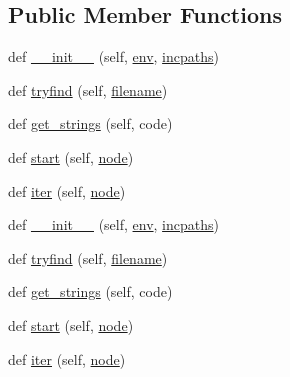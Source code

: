 \subsection*{Public Member Functions}
\begin{DoxyCompactItemize}
\item 
def \hyperlink{classwaflib_1_1_tools_1_1d__scan_1_1d__parser_a7fa583b71418108508c4fe69d9a0c269}{\+\_\+\+\_\+init\+\_\+\+\_\+} (self, \hyperlink{classwaflib_1_1_tools_1_1d__scan_1_1d__parser_aa28424987acc747e7ef28b0126fcb2c2}{env}, \hyperlink{classwaflib_1_1_tools_1_1d__scan_1_1d__parser_ab112695a99d61b3e5ae3d0014ae2210d}{incpaths})
\item 
def \hyperlink{classwaflib_1_1_tools_1_1d__scan_1_1d__parser_abee559e65fb60e81b8fe312d51f3fb57}{tryfind} (self, \hyperlink{test__portburn_8cpp_a7efa5e9c7494c7d4586359300221aa5d}{filename})
\item 
def \hyperlink{classwaflib_1_1_tools_1_1d__scan_1_1d__parser_ade8c37be217528fff038ca936888a7ce}{get\+\_\+strings} (self, code)
\item 
def \hyperlink{classwaflib_1_1_tools_1_1d__scan_1_1d__parser_aaae013d257f5425b6af59448cc311aae}{start} (self, \hyperlink{structnode}{node})
\item 
def \hyperlink{classwaflib_1_1_tools_1_1d__scan_1_1d__parser_a8c15f46ea130e19ea52e60cdcfec7c6e}{iter} (self, \hyperlink{structnode}{node})
\item 
def \hyperlink{classwaflib_1_1_tools_1_1d__scan_1_1d__parser_a7fa583b71418108508c4fe69d9a0c269}{\+\_\+\+\_\+init\+\_\+\+\_\+} (self, \hyperlink{classwaflib_1_1_tools_1_1d__scan_1_1d__parser_aa28424987acc747e7ef28b0126fcb2c2}{env}, \hyperlink{classwaflib_1_1_tools_1_1d__scan_1_1d__parser_ab112695a99d61b3e5ae3d0014ae2210d}{incpaths})
\item 
def \hyperlink{classwaflib_1_1_tools_1_1d__scan_1_1d__parser_abee559e65fb60e81b8fe312d51f3fb57}{tryfind} (self, \hyperlink{test__portburn_8cpp_a7efa5e9c7494c7d4586359300221aa5d}{filename})
\item 
def \hyperlink{classwaflib_1_1_tools_1_1d__scan_1_1d__parser_ade8c37be217528fff038ca936888a7ce}{get\+\_\+strings} (self, code)
\item 
def \hyperlink{classwaflib_1_1_tools_1_1d__scan_1_1d__parser_aaae013d257f5425b6af59448cc311aae}{start} (self, \hyperlink{structnode}{node})
\item 
def \hyperlink{classwaflib_1_1_tools_1_1d__scan_1_1d__parser_a8c15f46ea130e19ea52e60cdcfec7c6e}{iter} (self, \hyperlink{structnode}{node})
\item 

\end{DoxyCompactItemize}
